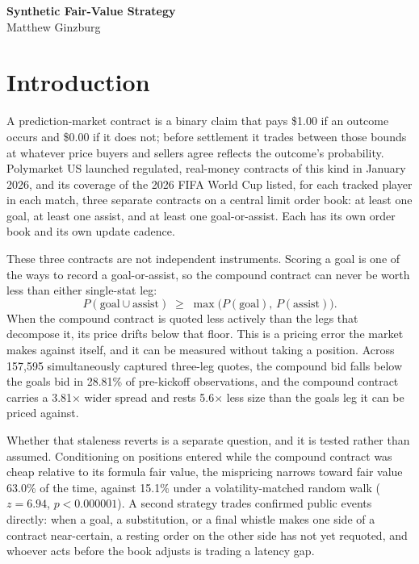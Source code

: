\documentclass[12pt]{article}
\begin{document}
\begin{center}
{\bfseries Synthetic Fair-Value Strategy}\\[2pt]
Matthew Ginzburg
\end{center}

\vspace{4pt}

\section{Introduction}

A prediction-market contract is a binary claim that pays \$1.00 if an outcome
occurs and \$0.00 if it does not; before settlement it trades between those
bounds at whatever price buyers and sellers agree reflects the outcome's
probability. Polymarket US launched regulated, real-money contracts of this kind
in January 2026, and its coverage of the 2026 FIFA World Cup listed, for each
tracked player in each match, three separate contracts on a central limit order
book: at least one goal, at least one assist, and at least one goal-or-assist.
Each has its own order book and its own update cadence.

These three contracts are not independent instruments. Scoring a goal is one of
the ways to record a goal-or-assist, so the compound contract can never be worth
less than either single-stat leg:
\[
P(\text{goal} \cup \text{assist}) \;\geq\; \max\!\big(P(\text{goal}),\,P(\text{assist})\big).
\]
When the compound contract is quoted less actively than the legs that decompose
it, its price drifts below that floor. This is a pricing error the market makes
against itself, and it can be measured without taking a position. Across
157{,}595 simultaneously captured three-leg quotes, the compound bid falls below
the goals bid in 28.81\% of pre-kickoff observations, and the compound contract
carries a 3.81$\times$ wider spread and rests 5.6$\times$ less size than the
goals leg it can be priced against.

Whether that staleness reverts is a separate question, and it is tested rather
than assumed. Conditioning on positions entered while the compound contract was
cheap relative to its formula fair value, the mispricing narrows toward fair
value 63.0\% of the time, against 15.1\% under a volatility-matched random walk
($z = 6.94$, $p < 0.000001$). A second strategy trades confirmed public
events directly: when a goal, a substitution, or a final whistle makes one side
of a contract near-certain, a resting order on the other side has not yet
requoted, and whoever acts before the book adjusts is trading a latency gap.
\end{document}
